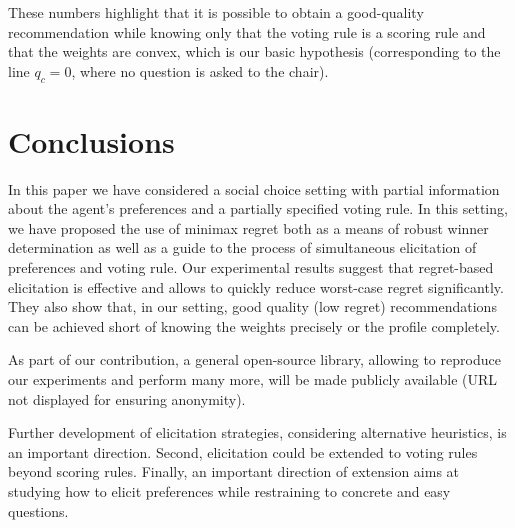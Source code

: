 \documentclass{article}
\begin{document}
These numbers highlight that it is possible to obtain a good-quality recommendation while knowing only that the voting rule is a scoring rule and that the weights are convex, which is our basic hypothesis (corresponding to the line $q_c = 0$, where no question is asked to the chair).

\section{Conclusions}  
\label{sec:conclusions}
In this paper we have considered a social choice setting with partial information about the agent's preferences and a partially specified voting rule.
In this setting, we have proposed the use of minimax regret both as a means of robust winner determination as well as a guide to the process of simultaneous elicitation of preferences and voting rule.
Our experimental results %
suggest that regret-based elicitation is effective and allows to quickly reduce worst-case regret significantly. They also show that, in our setting, good quality (low regret) recommendations can be achieved short of knowing the weights precisely or the profile completely.

As part of our contribution, a general open-source library, allowing to reproduce our experiments and perform many more, will be made publicly available (URL not displayed for ensuring anonymity).

Further development of elicitation strategies, considering alternative heuristics, is an important direction. 
Second, elicitation could be extended to voting rules beyond scoring rules. 
Finally, an important direction of extension aims at studying how to elicit preferences while restraining to concrete and easy questions.

\end{document}
